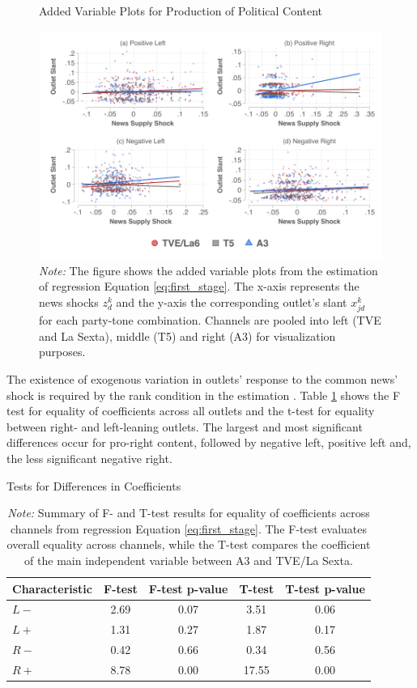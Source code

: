 \documentclass[12pt]{article}
\begin{document}
	
	
		\begin{figure}[!htb]
		\centering
\caption{Added Variable Plots for Production of Political Content}
		\includegraphics[width=160mm]{figures/fwl_plots_v2}
		\caption*{\small \textit{Note:} The figure shows the added variable plots from the estimation of regression Equation \ref{eq:first_stage}. The x-axis represents the news shocks $z_d^k $ and the y-axis the corresponding outlet's slant $x_{jd}^k $ for each party-tone combination. Channels are pooled into left (TVE and La Sexta), middle (T5) and right (A3) for visualization purposes.  }
		\label{fig:fwl}
	\end{figure}
	
		The existence of exogenous variation in outlets' response to the common news' shock is required by the rank condition in the estimation \citep{berry_haile_econometrica}.  Table \ref{tab:tests}   shows the F test for equality of coefficients across all outlets and the t-test for equality between right- and left-leaning outlets. The largest and most significant differences occur for pro-right content, followed by negative left, positive left and, the less significant negative right. 
	
	
	
	\begin{table}[!htbp]
		\centering
	

		\caption{Tests for Differences in Coefficients}
		\begin{tabular}{lcccc}
			\hline
			Characteristic & F-test  & F-test p-value & T-test  & T-test p-value \\
			\hline
			$ {L-}$& 2.69 & 0.07 & 3.51  & 0.06 \\
			$ {L+}$ & 1.31 & 0.27 & 1.87  & 0.17 \\
			$ {R-}$ & 0.42 & 0.66 & 0.34 & 0.56 \\
$ {R+}$ & 8.78 & 0.00 & 17.55  & 0.00 \\
			\hline
		\end{tabular}
			\caption*{\small \textit{Note:} Summary of F- and T-test results for equality of coefficients across channels from regression Equation \ref{eq:first_stage}. The F-test evaluates overall equality across channels, while the T-test compares the coefficient of the main independent variable between A3 and TVE/La Sexta.}
					\label{tab:tests}
	\end{table}
	
\end{document}

